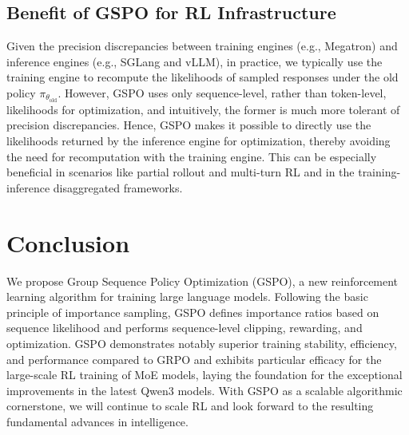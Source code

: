 \subsection{Benefit of GSPO for RL Infrastructure}

Given the precision discrepancies between training engines (e.g., Megatron) and inference engines (e.g., SGLang and vLLM), in practice, we typically use the training engine to recompute the likelihoods of sampled responses under the old policy $\pi_{\theta_\text{old}}$.
However, GSPO uses only sequence-level, rather than token-level, likelihoods for optimization, and intuitively, the former is much more tolerant of precision discrepancies. Hence, GSPO makes it possible to directly use the likelihoods returned by the inference engine for optimization, thereby avoiding the need for recomputation with the training engine. This can be especially beneficial in scenarios like partial rollout and multi-turn RL and in the training-inference disaggregated frameworks.

\section{Conclusion}

We propose Group Sequence Policy Optimization (GSPO), a new reinforcement learning algorithm for training large language models. Following the basic principle of importance sampling, GSPO defines importance ratios based on sequence likelihood and performs sequence-level clipping, rewarding, and optimization. GSPO demonstrates notably superior training stability, efficiency, and performance compared to GRPO and exhibits particular efficacy for the large-scale RL training of MoE models, laying the foundation for the exceptional improvements in the latest Qwen3 models. With GSPO as a scalable algorithmic cornerstone, we will continue to scale RL and look forward to the resulting fundamental advances in intelligence.


